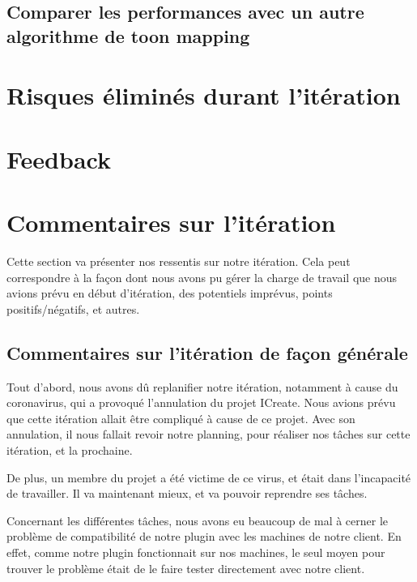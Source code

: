 \documentclass[12pt,titlepage,french]{article}
\begin{document}
\subsection{Comparer les performances avec un autre algorithme de toon mapping}

\section{Risques éliminés durant l'itération}


\section{Feedback}

\section{Commentaires sur l'itération}

Cette section va présenter nos ressentis sur notre itération. Cela peut correspondre à la façon dont nous avons pu gérer la charge de travail que nous avions prévu en début d'itération, des potentiels imprévus, points positifs/négatifs, et autres.

\subsection{Commentaires sur l'itération de façon générale}

Tout d'abord, nous avons dû replanifier notre itération, notamment à cause du coronavirus, qui a provoqué l'annulation du projet ICreate. Nous avions prévu que cette itération allait être compliqué à cause de ce projet. Avec son annulation, il nous fallait revoir notre planning, pour réaliser nos tâches sur cette itération, et la prochaine. \newline

De plus, un membre du projet a été victime de ce virus, et était dans l'incapacité de travailler. Il va maintenant mieux, et va pouvoir reprendre ses tâches. \newline

Concernant les différentes tâches, nous avons eu beaucoup de mal à cerner le problème de compatibilité de notre plugin avec les machines de notre client. En effet, comme notre plugin fonctionnait sur nos machines, le seul moyen pour trouver le problème était de le faire tester directement avec notre client. \newline
\end{document}
